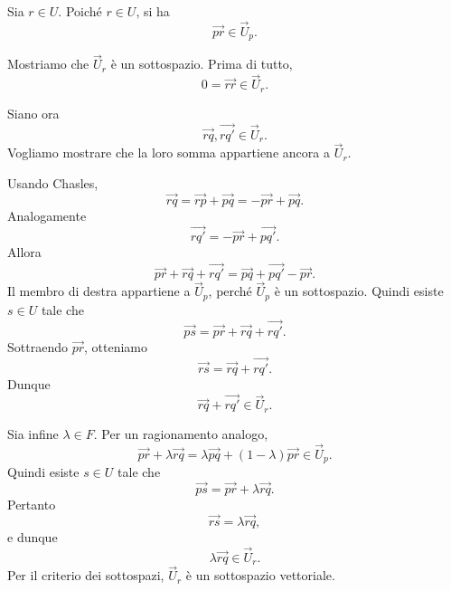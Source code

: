 \documentclass[a4paper]{article}
\begin{document}
\begin{snippetproof}{}
    Sia \(r\in U\). Poiché \(r\in U\), si ha
    \[
        \overrightarrow{pr}\in\overrightarrow{U}_p.
    \]

    Mostriamo che \(\overrightarrow{U}_r\) è un sottospazio. Prima di tutto,
    \[
        0=\overrightarrow{rr}\in\overrightarrow{U}_r.
    \]

    Siano ora
    \[
        \overrightarrow{rq},
        \overrightarrow{rq'}
        \in\overrightarrow{U}_r.
    \]
    Vogliamo mostrare che la loro somma appartiene ancora a \(\overrightarrow{U}_r\).

    Usando Chasles,
    \[
        \overrightarrow{rq}
        =
        \overrightarrow{rp}
        +
        \overrightarrow{pq}
        =
        -\overrightarrow{pr}+\overrightarrow{pq}.
    \]
    Analogamente
    \[
        \overrightarrow{rq'}
        =
        -\overrightarrow{pr}+\overrightarrow{pq'}.
    \]
    Allora
    \[
        \overrightarrow{pr}
        +
        \overrightarrow{rq}
        +
        \overrightarrow{rq'}
        =
        \overrightarrow{pq}
        +
        \overrightarrow{pq'}
        -
        \overrightarrow{pr}.
    \]
    Il membro di destra appartiene a \(\overrightarrow{U}_p\), perché \(\overrightarrow{U}_p\) è un sottospazio. Quindi esiste \(s\in U\) tale che
    \[
        \overrightarrow{ps}
        =
        \overrightarrow{pr}
        +
        \overrightarrow{rq}
        +
        \overrightarrow{rq'}.
    \]
    Sottraendo \(\overrightarrow{pr}\), otteniamo
    \[
        \overrightarrow{rs}
        =
        \overrightarrow{rq}
        +
        \overrightarrow{rq'}.
    \]
    Dunque
    \[
        \overrightarrow{rq}
        +
        \overrightarrow{rq'}
        \in\overrightarrow{U}_r.
    \]

    Sia infine \(\lambda\in F\). Per un ragionamento analogo,
    \[
        \overrightarrow{pr}
        +
        \lambda\overrightarrow{rq}
        =
        \lambda\overrightarrow{pq}
        +
        (1-\lambda)\overrightarrow{pr}
        \in\overrightarrow{U}_p.
    \]
    Quindi esiste \(s\in U\) tale che
    \[
        \overrightarrow{ps}
        =
        \overrightarrow{pr}
        +
        \lambda\overrightarrow{rq}.
    \]
    Pertanto
    \[
        \overrightarrow{rs}
        =
        \lambda\overrightarrow{rq},
    \]
    e dunque
    \[
        \lambda\overrightarrow{rq}\in\overrightarrow{U}_r.
    \]
    Per il criterio dei sottospazi, \(\overrightarrow{U}_r\) è un sottospazio vettoriale.
\end{snippetproof}
\end{document}
